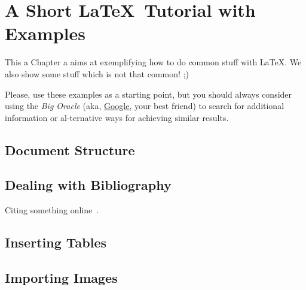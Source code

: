 
%

\makeatletter
\newcommand{\ntifpkgloaded}{%
  \@ifpackageloaded%
}
\makeatother


\chapter{A Short \LaTeX\ Tutorial with Examples}
\label{cha:a_short_latex_tutorial_with_examples}

This a Chapter a aims at exemplifying how to do common stuff with \LaTeX. We also show some stuff which is not that common! ;)

Please, use these examples as a starting point, but you should always consider using the \emph{Big Oracle} (aka, \href{http://www.google.com}{Google}, your best friend) to search for additional information or al-ternative ways for achieving similar results.

\section{Document Structure} %
\label{sec:document_structure}



\section{Dealing with Bibliography} %
\label{sec:dealing_with_bibliography}

Citing something online~\cite{wiki:shuntingyard,flex,bison}.



\section{Inserting Tables} %
\label{sec:inserting_tables}



\section{Importing Images} %
\label{sec:importing_images}

